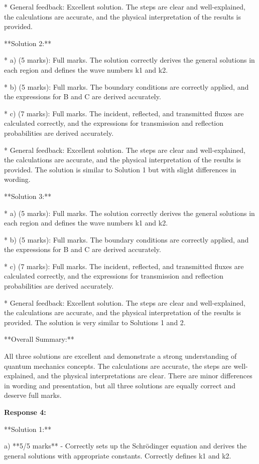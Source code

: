 \documentclass[a4paper,11pt]{article}
\begin{document}
* General feedback: Excellent solution. The steps are clear and well-explained, the calculations are accurate, and the physical interpretation of the results is provided.

**Solution 2:**

* a) (5 marks): Full marks. The solution correctly derives the general solutions in each region and defines the wave numbers k1 and k2.

* b) (5 marks): Full marks. The boundary conditions are correctly applied, and the expressions for B and C are derived accurately.

* c) (7 marks): Full marks. The incident, reflected, and transmitted fluxes are calculated correctly, and the expressions for transmission and reflection probabilities are derived accurately.

* General feedback: Excellent solution. The steps are clear and well-explained, the calculations are accurate, and the physical interpretation of the results is provided. The solution is similar to Solution 1 but with slight differences in wording.

**Solution 3:**

* a) (5 marks): Full marks. The solution correctly derives the general solutions in each region and defines the wave numbers k1 and k2.

* b) (5 marks): Full marks. The boundary conditions are correctly applied, and the expressions for B and C are derived accurately.

* c) (7 marks): Full marks. The incident, reflected, and transmitted fluxes are calculated correctly, and the expressions for transmission and reflection probabilities are derived accurately.

* General feedback: Excellent solution. The steps are clear and well-explained, the calculations are accurate, and the physical interpretation of the results is provided. The solution is very similar to Solutions 1 and 2.

**Overall Summary:**

All three solutions are excellent and demonstrate a strong understanding of quantum mechanics concepts. The calculations are accurate, the steps are well-explained, and the physical interpretations are clear. There are minor differences in wording and presentation, but all three solutions are equally correct and deserve full marks.

\textbf{Response 4:}

**Solution 1:**

a) **5/5 marks** - Correctly sets up the Schrödinger equation and derives the general solutions with appropriate constants. Correctly defines k1 and k2.
\end{document}
